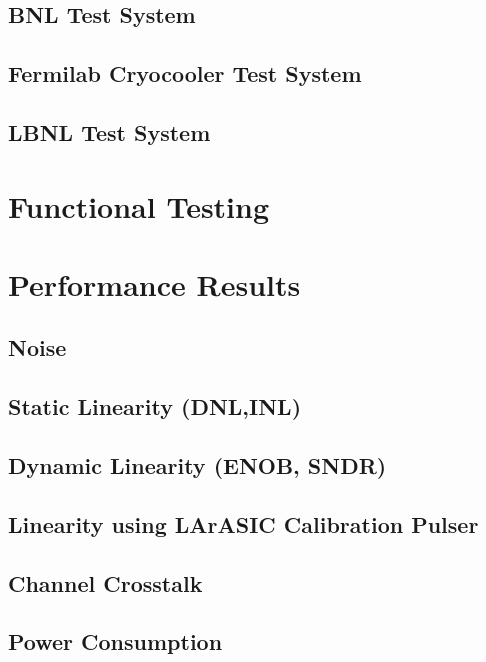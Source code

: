 \documentclass[10pt]{article}
\begin{document}
\subsection{BNL Test System }

\subsection{Fermilab Cryocooler Test System }

\subsection{LBNL Test System }


\newpage
\section{Functional Testing }


	
\newpage
\section{Performance Results}


\subsection{Noise}


\clearpage
\newpage
\subsection{Static Linearity (DNL,INL)}

\subsection{Dynamic Linearity (ENOB, SNDR)}

\clearpage
\newpage
\subsection{Linearity using LArASIC Calibration Pulser}

\clearpage
\newpage
\subsection{Channel Crosstalk }

\clearpage
\newpage
\subsection{Power Consumption }

\end{document}
